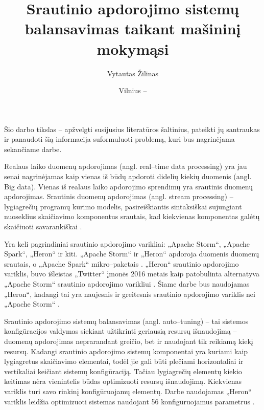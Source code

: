 \documentclass{VUMIFPSbakalaurinis}
\title{Srautinio apdorojimo sistemų balansavimas taikant mašininį mokymąsi}
\author{Vytautas Žilinas}
\date{Vilnius – \the\year}
\begin{document}
 
\maketitle

\cleardoublepage{}
\setcounter{page}{2}

\tableofcontents


Šio darbo tikslas – apžvelgti susijusius literatūros šaltinius, pateikti jų santraukas ir panaudoti šią informacija suformuluoti problemą, kuri bus nagrinėjama sekančiame darbe. 

Realaus laiko duomenų apdorojimas (angl. real–time data processing) yra jau senai nagrinėjamas kaip vienas iš būdų apdoroti didelių kiekių duomenis (angl. Big data). Vienas iš realaus laiko apdorojimo sprendimų yra srautinis duomenų apdorojimas. Srautinis duomenų apdorojimas (angl. stream processing) – lygiagrečių programų kūrimo modelis, pasireiškiantis sintaksiškai sujungiant nuoseklius skaičiavimo komponentus srautais, kad kiekvienas komponentas galėtų skaičiuoti savarankiškai \cite{shortstreamproc}. 

Yra keli pagrindiniai srautinio apdorojimo varikliai: „Apache Storm“, „Apache Spark“, „Heron“ ir kiti. „Apache Storm“ ir „Heron“ apdoroja duomenis duomenų srautais, o „Apache Spark“ mikro–paketais \cite{karau2015learning}. „Heron“ srautinio apdorojimo variklis, buvo išleistas „Twitter“ įmonės 2016 metais kaip patobulinta alternatyva „Apache Storm“ srautinio apdorojimo varikliui \cite{openSourcing}. Šiame darbe bus naudojamas „Heron“, kadangi tai yra naujesnis ir greitesnis srautinio apdorojimo variklis nei „Apache Storm“ \cite{twitterHeron}. 

Srautinio apdorojimo sistemų balansavimas (angl. auto–tuning) – tai sistemos konfigūracijos valdymas siekiant užtikrinti geriausią resursų išnaudojimą – duomenų apdorojimas neprarandant greičio, bet ir naudojant tik reikiamą kiekį resursų. Kadangi srautinio apdorojimo sistemų komponentai yra kuriami kaip lygiagretus skaičiavimo elementai, todėl jie gali būti plečiami horizontaliai ir vertikaliai \cite{shortstreamproc} keičiant sistemų konfigūraciją. Tačiau lygiagrečių elementų kiekio keitimas nėra vienintelis būdas optimizuoti resursų išnaudojimą. Kiekvienas variklis turi savo rinkinį konfigūruojamų elementų. Darbe naudojamas „Heron“ variklis leidžia optimizuoti sistemas naudojant 56 konfigūruojamus parametrus \cite{configDocument}.
\end{document}
